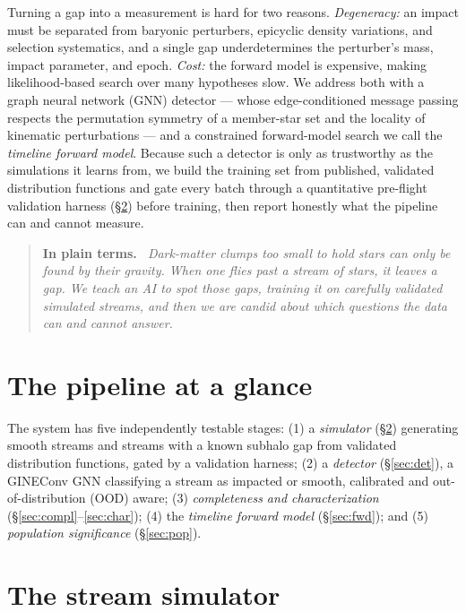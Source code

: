 \documentclass[fleqn,usenatbib]{mnras}
\newenvironment{plainterms}%
  {\par\medskip\begin{quotation}\noindent\small\textbf{In plain terms.}\itshape\ }%
  {\end{quotation}\medskip}
\begin{document}
Turning a gap into a measurement is hard for two reasons. \emph{Degeneracy:} an impact
must be separated from baryonic perturbers, epicyclic density variations, and
selection systematics, and a single gap underdetermines the perturber's mass, impact
parameter, and epoch. \emph{Cost:} the forward model is expensive, making
likelihood-based search over many hypotheses slow. We address both with a graph neural
network (GNN) detector --- whose edge-conditioned message passing \citep{Hu2020gine}
respects the permutation symmetry of a member-star set and the locality of kinematic
perturbations --- and a constrained forward-model search we call the \emph{timeline
forward model}. Because such a detector is only as trustworthy as the simulations it
learns from, we build the training set from published, validated distribution
functions and gate every batch through a quantitative pre-flight validation harness
(\S\ref{sec:sim}) before training, then report honestly what the pipeline can and
cannot measure.

\begin{plainterms}
Dark-matter clumps too small to hold stars can only be found by their gravity. When
one flies past a stream of stars, it leaves a gap. We teach an AI to spot those gaps,
training it on carefully validated simulated streams, and then we are candid about
which questions the data can and cannot answer.
\end{plainterms}

\section{The pipeline at a glance}
The system has five independently testable stages: (1) a \emph{simulator}
(\S\ref{sec:sim}) generating smooth streams and streams with a known subhalo gap from
validated distribution functions, gated by a validation harness; (2) a \emph{detector}
(\S\ref{sec:det}), a GINEConv GNN classifying a stream as impacted or smooth,
calibrated and out-of-distribution (OOD) aware; (3) \emph{completeness and
characterization} (\S\ref{sec:compl}--\ref{sec:char}); (4) the \emph{timeline forward
model} (\S\ref{sec:fwd}); and (5) \emph{population significance} (\S\ref{sec:pop}).

\section{The stream simulator}
\label{sec:sim}
\end{document}
